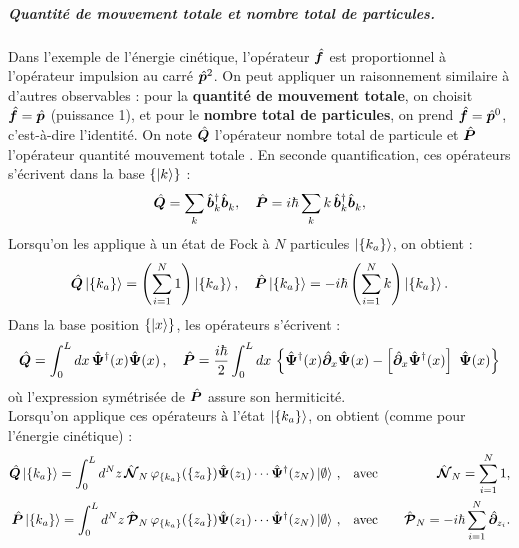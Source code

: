 \subparagraph{Quantité de mouvement totale et nombre total de particules.}
Dans l'exemple de l'énergie cinétique, l'opérateur  $\hat{\bm{f}}$ est proportionnel à l'opérateur impulsion au carré $\hat{\bm{p}}^2$. On peut appliquer un raisonnement similaire à d'autres observables : pour la {\bf quantité de mouvement totale}, on choisit $\hat{\bm{f}} = \hat{\bm{p}}$ (puissance 1), et pour le {\bf nombre total de particules}, on prend  $\hat{\bm{f}} = \hat{\bm{p}}^0$, c’est-à-dire l’identité. On note $\hat{\bm{Q}}$ l'opérateur nombre total de particule et $\hat{\bm{P}}$ l'opérateur quantité mouvement totale . En seconde quantification, ces opérateurs s'écrivent dans la base \( \{ \ket{k} \} \) : 
\begin{equation}
	\hat{\bm{Q}} = \sum_{k}  \hat{\bm{b}}^\dagger_k \hat{\bm{b}}_k^{} , \quad  \hat{\bm{P}} = i\hbar\sum_{k} k \, \hat{\bm{b}}^\dagger_k \hat{\bm{b}}_k^{},\label{eq.chap.1.Q.P.k.1}
\end{equation}
Lorsqu’on les applique à un état de Fock à $N$ particules \(\ket{\{k_a\}}\), on obtient :
\begin{eqnarray}\label{eq.chap.1.Q.P.k.2}
	\hat{\bm{Q}} \ket{\{k_a\}} = \left( \sum_{i = 1}^N 1 \right) \ket{\{k_a\}},\quad \hat{\bm{P}} \ket{\{k_a\}} = -i\hbar \left( \sum_{i = 1}^N k \right) \ket{\{k_a\}}.
\end{eqnarray}
Dans la base position \( \{ \ket{x} \} \), les opérateurs s’écrivent : 
\begin{eqnarray}\label{eq.chap.1.Q.P.k.3}
	\operator{Q}  =  \int_0^L dx \, \operator{\Psi}^\dag (x) \operator{\Psi} (x) \, , \quad 
	\operator{P}  =  \frac{i\hbar}2 \int_0^L dx \, \left \{  \operator{\Psi}^\dag(x) \operator{\partial}_x \operator{\Psi}(x) - \left [\operator{\partial}_x \operator{\Psi}^\dag(x)\right ] \operator{\Psi}(x)\right \} 
\end{eqnarray}
où l'expression symétrisée de $\hat{\bm{P}}$ assure son hermiticité.\\ 
Lorsqu'on applique ces opérateurs à l’état \(\ket{\{k_a\}}\), on obtient (comme pour l’énergie cinétique) :
\begin{eqnarray}
	\hat{\bm{Q}}\ket{ \{k_a\}} =  \int_0^L d^N z \, \hat{\bm{\mathcal{N}}}_N \, \varphi_{\{k_a\}}(\{z_a\} ) \hat{\bm{\Psi}}(z_1) \cdots \hat{\bm{\Psi}}^\dag(z_N) \ket{\emptyset}\, , \quad &\mbox{avec}& \quad \hat{\bm{\mathcal{N}}}_N = \sum_{i=1}^N 1,\label{eq.chap.1.Q.1}\\
	\hat{\bm{P}}\ket{ \{k_a\}} =  \int_0^L d^N z \, \hat{\bm{\mathcal{P}}}_N \, \varphi_{\{k_a\}}(\{z_a\} ) \hat{\bm{\Psi}}(z_1) \cdots \hat{\bm{\Psi}}^\dag(z_N) \ket{\emptyset}\, , \quad &\mbox{avec}& \quad \hat{\bm{\mathcal{P}}}_N = -i\hbar \sum_{i=1}^N \hat{\bm{\partial}}_{z_i}\label{eq.chap.1.P.1}.
\end{eqnarray}

